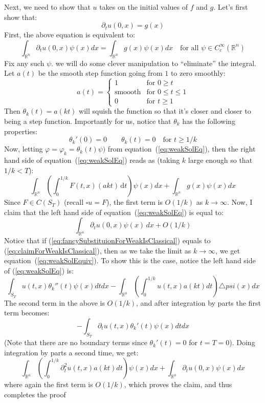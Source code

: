 \documentclass{book}
\newenvironment{Proof}[1][]
  {\begin{ProofTcb}[#1]}
  {\end{ProofTcb}}
\newcommand{\R}{{\mathbb{R}}}
\renewcommand{\phi}{\varphi}
\newcommand{\rw}{\rightarrow}
\begin{document}
\begin{Proof}
	Next, we need to show that $u$ takes on the initial values of $f$ and $g$. Let's first show that:
	\[
		 \partial_t u(0, x) = g(x)
	 \]
	 First, the above equation is equivalent to:
	 \begin{equation}\label{eq:weakSolEquiv}
	   \int_{\R^n}  \partial_t u(0,x) \psi(x)dx = \int_{\R^n} g(x)\psi(x)dx \quad\text{for all $\psi \in C_c^\infty(\R^n)$}
	 \end{equation}
	 Fix any such $\psi$. we will do some clever manipulation to ``eliminate'' the integral. Let $a(t)$ be the smooth step function going from $1$ to zero smoothly:
	 \[
		 a(t) = \begin{cases}
			 1 &\text{for $0 \ge t$}\\
			 \text{smoooth} & \text{for $0 \le t \le 1$}\\
			 0 & \text{for $t \ge 1$}
		 \end{cases}
	 \]
	 Then $\theta_k(t) = a(kt)$ will squish the function so that it's closer and closer to being a step function.
	 Importantly for us, notice that $\theta_k$ has the following properties:
	 \[
		 \theta_k'(0) = 0\qquad \theta_k(t) = 0 \quad\text{for $t \ge 1/k$}
	 \]
	 Now, letting $\phi = \phi_k = \theta_k(t)\psi)$ from equation~(\ref{eq:weakSolEq}), then the right hand side of
	 equation~(\ref{eq:weakSolEq}) reads as (taking $k$ large enough so that $1/k < T$):
	 \begin{equation}\label{eq:fancySubstituionForWeakIsClassical}
	   \int_{\R^n} \left( \int_{0}^{1/k} F(t,x)(akt)\,\textrm{d}t \right)\psi(x)dx + \int_{\R^n} g(x)\psi(x)dx
	 \end{equation}
	 Since $F \in C(S_T)$ (recall $\square u = F$), the first term is $O(1/k)$ as $k \rw \infty$. Now, I claim that the
	 left hand side of equation~(\ref{eq:weakSolEq}) is equal to:
	 \begin{equation}\label{eq:claimForWeakIsClassical}
	   \int_{\R^n}  \partial_t u(0,x)\psi(x)\, dx + O(1/k)
	 \end{equation}
	 Notice that if (\ref{eq:fancySubstituionForWeakIsClassical}) equals to (\ref{eq:claimForWeakIsClassical}), then as
	 we take the limit as $k \rw \infty$, we get equation~(\ref{eq:weakSolEquiv}). To show this is the case, notice the
	 left hand side of (\ref{eq:weakSolEq}) is:
	 \[
		 \int_{S_T} u(t,x) \theta_k''(t)\psi(x)dtdx - \int_{\R^n} \left( \int_{0}^{1/k} u(t,x)a(kt)dt \right)\triangle
		 psi(x)dx
	 \]
	 The second term in the above is $O(1/k)$, and after integration by parts the first term becomes:
	 \[
		 -\int_{S_T}  \partial_tu(t,x) \theta_k'(t)\psi(x)dtdx
	 \]
	 (Note that there are no boundary terms since $\theta_k'(t) = 0$ for $t = T = 0$). Doing integration by parts
	 a second time, we get:
	 \[
		 \int_{\R^n} \left( \int_0^{1/k}  \partial_t^2 u(t,x) a(kt)dt \right)\psi(x)dx + \int_{\R^n}  \partial_t
		 u(0,x)\psi(x)dx
	 \]
	 where again the first term is $O(1/k)$, which proves the claim, and thus completes the proof
 \end{Proof}
\end{document}
